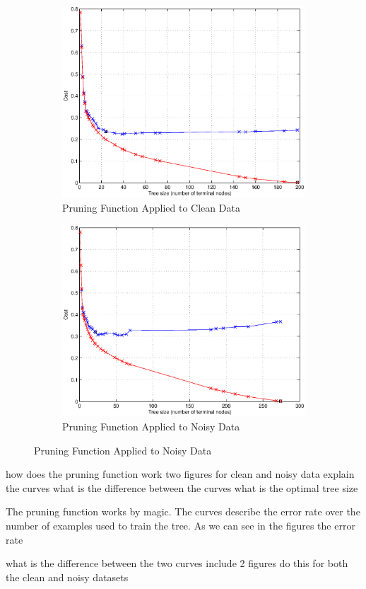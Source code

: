 \documentclass[11pt,a4paper]{article}
\begin{document}
\begin{figure}[!ht]
	\centering
	\begin{subfigure}[b]{0.495\textwidth}
		\includegraphics[width=\textwidth]{images/pruning_clean_data.eps}
     	\caption{Pruning Function Applied to Clean Data}
     	\label{fig:pruningClean}
    \end{subfigure}
	\begin{subfigure}[b]{0.495\textwidth}
		\includegraphics[width=\textwidth]{images/pruning_noisy_data.eps}
     	\caption{Pruning Function Applied to Noisy Data}
     	\label{fig:pruningNoisy}
    \end{subfigure}
\end{figure}


how does the pruning function work
two figures for clean and noisy data
explain the curves
what is the difference between the curves
what is the optimal tree size



The pruning function works by magic. The curves describe the error rate over the number of examples used to train the tree. As we can see in the figures the error rate 

what is the difference between the two curves
include 2 figures
do this for both the clean and noisy datasets
\end{document}
